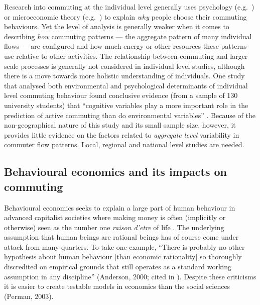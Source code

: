 \documentclass[a4paper, 11pt, twoside]{Thesis}
\begin{document}
Research into commuting at the individual level generally uses psychology
(e.g.~\citealp{van1998social}) or microeconomic theory (e.g.~\citealp{van1999job}) to explain
\emph{why} people choose their commuting behaviours.
Yet the level of analysis is generally weaker when it comes to describing
\emph{how} commuting patterns --- the aggregate pattern of many individual flows ---
are configured and how much energy or other resources these patterns
use relative to other activities.
The relationship between commuting and larger scale processes
is generally not considered in individual level studies, although
there is a move towards more holistic understanding of individuals.
One study that analysed both environmental and psychological
determinants of individual level commuting behaviour found conclusive evidence
(from a sample of 130 university students) that ``cognitive variables play
a more important role in the prediction of active commuting than do environmental
variables'' \citep[p.~9]{Lemieux2009}. Because of the non-geographical nature
of this study and its small sample size, however, it provides little evidence
on the factors related to \emph{aggregate level} variability in commuter flow
patterns. Local, regional and national level studies are needed.

\subsection{Behavioural economics and its impacts on commuting}
Behavioural economics seeks to explain a large part of human behaviour in advanced
capitalist societies where making money is often (implicitly or otherwise) seen
as the number one \emph{raison d'etre} of life \citep{Eisenstein2011}.
The underlying assumption that human beings are rational beings
has of course come under attack from many quarters. To take one 
example, ``There is probably no other hypothesis about human behaviour [than
economic rationality] so thoroughly discredited on empirical grounds that still
operates as a standard working assumption in any discipline''
(Anderson, 2000; cited in \citealp[p.~34]{Exel2011-b-ec}). 
Despite these criticisms it is easier to create testable models in economics 
than the social sciences (Perman, 2003).
\end{document}

